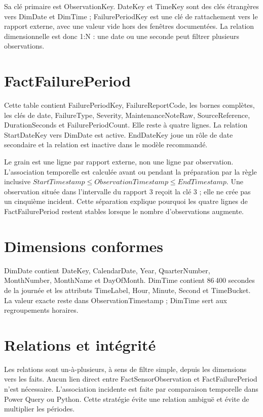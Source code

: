 Sa clé primaire est ObservationKey. DateKey et TimeKey sont des clés étrangères vers DimDate et DimTime ; FailurePeriodKey est une clé de rattachement vers le rapport externe, avec une valeur vide hors des fenêtres documentées. La relation dimensionnelle est donc 1:N : une date ou une seconde peut filtrer plusieurs observations.

\section{FactFailurePeriod}
Cette table contient FailurePeriodKey, FailureReportCode, les bornes complètes, les clés de date, FailureType, Severity, MaintenanceNoteRaw, SourceReference, DurationSeconds et FailurePeriodCount. Elle reste à quatre lignes. La relation StartDateKey vers DimDate est active. EndDateKey joue un rôle de date secondaire et la relation est inactive dans le modèle recommandé.

Le grain est une ligne par rapport externe, non une ligne par observation. L'association temporelle est calculée avant ou pendant la préparation par la règle inclusive $StartTimestamp \leq ObservationTimestamp \leq EndTimestamp$. Une observation située dans l'intervalle du rapport 3 reçoit la clé 3 ; elle ne crée pas un cinquième incident. Cette séparation explique pourquoi les quatre lignes de FactFailurePeriod restent stables lorsque le nombre d'observations augmente.

\section{Dimensions conformes}
DimDate contient DateKey, CalendarDate, Year, QuarterNumber, MonthNumber, MonthName et DayOfMonth. DimTime contient 86\,400 secondes de la journée et les attributs TimeLabel, Hour, Minute, Second et TimeBucket. La valeur exacte reste dans ObservationTimestamp ; DimTime sert aux regroupements horaires.

\section{Relations et intégrité}
Les relations sont un-à-plusieurs, à sens de filtre simple, depuis les dimensions vers les faits. Aucun lien direct entre FactSensorObservation et FactFailurePeriod n'est nécessaire. L'association incidente est faite par comparaison temporelle dans Power Query ou Python. Cette stratégie évite une relation ambiguë et évite de multiplier les périodes.

